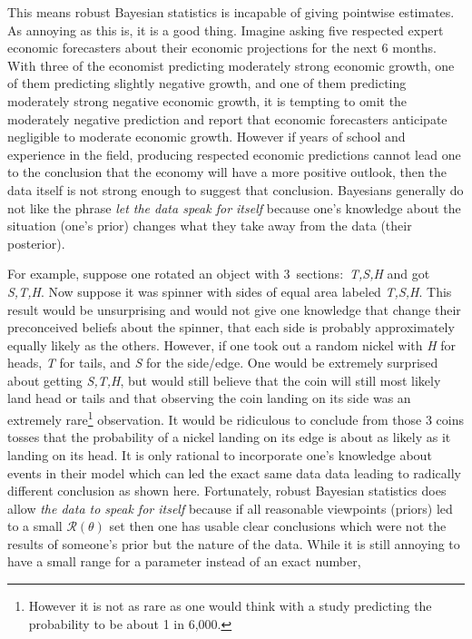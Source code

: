 \documentclass[12pt,letterpaper]{article}
\begin{document}
This means robust Bayesian statistics is incapable of giving pointwise estimates. 
As annoying as this is, it is a good thing. 
Imagine asking five respected expert economic forecasters about their economic projections for the next 6 months. 
With three of the economist predicting moderately strong economic growth, one of them predicting slightly negative growth, 
and one of them predicting moderately strong negative economic growth, it is tempting to omit the moderately negative 
prediction and report that economic forecasters anticipate negligible to moderate economic growth.
However if years of school and experience in the field, producing respected economic predictions cannot lead one to the conclusion that the economy
will have a more positive outlook, then the data itself is not strong enough to suggest that conclusion. 
Bayesians generally do not like the phrase \textit{let the data speak for itself} because one's knowledge about the situation (one's prior)
changes what they take away from the data (their posterior).
\par
For example, suppose one rotated an object with \mbox{3 sections: \textit{T,S,H}} 
and got \textit{S,T,H}. Now suppose it was spinner with sides of equal area labeled \textit{T,S,H}. 
This result would be unsurprising and would not give one knowledge 
that change their preconceived beliefs about the spinner, that each side is probably approximately equally likely as the others. 
However, if one took out a random nickel with \textit{H} for heads, \textit{T} for tails, and \textit{S} for the side/edge. 
One would be extremely surprised about getting \textit{S,T,H}, but would still believe that the coin 
will still most likely land head or tails and that observing the coin landing on its side was an extremely 
rare\footnote{However it is not as rare as one would think with a study predicting the probability to be about 1 in 6,000\cite{PhysRevE.48.2547}.} 
observation. It would be ridiculous to conclude from those 3 coins tosses that the probability of a nickel landing on its edge 
is about as likely as it landing on its head. It is only rational to incorporate one's knowledge about events in their model 
which can led the exact same data data leading to radically different conclusion as shown here.
Fortunately, robust Bayesian statistics does allow \textit{the data to speak for itself} because if all reasonable viewpoints (priors)
led to a small $\mathcal{R}(\theta)$ set then one has usable clear conclusions which were not the results of someone's prior 
but the nature of the data. While it is still annoying to have a small range for a parameter instead of an exact number,
\end{document}
